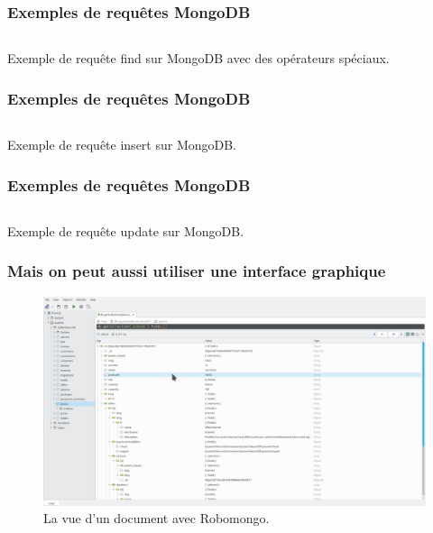     \begin{frame}
        \frametitle{Exemples de requêtes MongoDB}

        \begin{listing}[H]
            \inputminted{javascript}{code/requeteMongoFindOperator.js}
            \caption{Exemple de requête find sur MongoDB avec des opérateurs spéciaux.}
            \label{findOperatorMongoDB}
        \end{listing}
    \end{frame}

    \begin{frame}
        \frametitle{Exemples de requêtes MongoDB}

        \begin{listing}[H]
            \inputminted{javascript}{code/requeteMongoInsert.js}
            \caption{Exemple de requête insert sur MongoDB.}
            \label{insertMongoDB}
        \end{listing}
    \end{frame}

    \begin{frame}
        \frametitle{Exemples de requêtes MongoDB}

        \begin{listing}[H]
            \inputminted{javascript}{code/requeteMongoUpdate.js}
            \caption{Exemple de requête update sur MongoDB.}
            \label{updateMongoDB}
        \end{listing}
    \end{frame}

    \begin{frame}
        \frametitle{Mais on peut aussi utiliser une interface graphique}

        \begin{figure}[htb]
            \includegraphics[width=1\textwidth]{images/robomongo.png}
            \caption{La vue d'un document avec Robomongo.}
        \end{figure}
    \end{frame}


